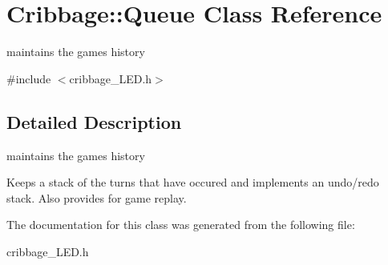 \hypertarget{class_cribbage_1_1_queue}{}\section{Cribbage\+:\+:Queue Class Reference}
\label{class_cribbage_1_1_queue}


maintains the game\textquotesingle{}s history  




{\ttfamily \#include $<$cribbage\+\_\+\+L\+E\+D.\+h$>$}



\subsection{Detailed Description}
maintains the game\textquotesingle{}s history 

Keeps a stack of the turns that have occured and implements an undo/redo stack. Also provides for game replay. 

The documentation for this class was generated from the following file\+:\begin{DoxyCompactItemize}
\item 
cribbage\+\_\+\+L\+E\+D.\+h\end{DoxyCompactItemize}
